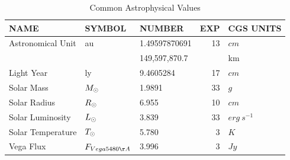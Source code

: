 \begin{table}[!ht]
{}
\caption{Common Astrophysical Values}
\centering
{\small
\begin{tabular}{| l | l | l | r | l |}
\hline
NAME                & SYMBOL            & NUMBER  & EXP&  CGS UNITS            \\
\hline
Astronomical Unit   &au                 & 1.49597870691   & 13   & $cm$        \\
                    &                   & 149,597,870.7   &      & km           \\
Light Year          &ly                 & 9.4605284       & 17   & $cm$         \\
Solar Mass          &$M_{\odot}$         & 1.9891         & 33   & $g$          \\
Solar Radius        &$R_{\odot}$         & 6.955          & 10   & $cm$         \\
Solar Luminosity    &$L_{\odot}$         & 3.839          & 33   & $erg\ s^{-1}$ \\
Solar Temperature   &$T_{\odot}$         & 5.780          &  3   & $K$          \\
Vega Flux           & $F_{Vega 5480\AA}$   & 3.996          & 3    & $Jy$         \\
\hline
\end{tabular}
\label{table:MassDistanceConstants}
} %
\end{table}

